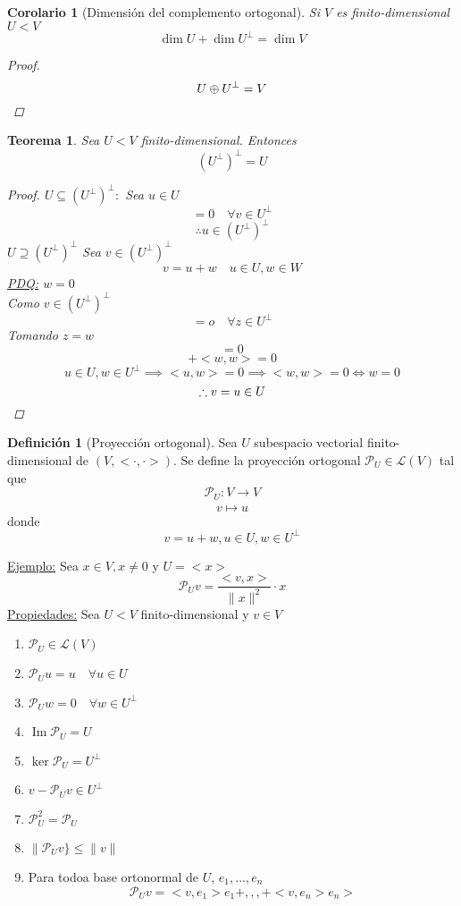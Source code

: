 \documentclass[11pt]{book}
\newcommand{\func}[5]{#1:#2\xrightarrow[#5]{#4}#3}
\DeclareMathOperator{\Ima}{Im}
\newtheorem{thm}{Teorema}[section]
\newtheorem*{cor}{Corolario}
\theoremstyle{definition}
\newtheorem{defn}{Definición}[section]
\begin{document}
\begin{cor}[Dimensión del complemento ortogonal]
	Si $V$ es finito-dimensional $U<V$
	\[\dim U+\dim U^\perp=\dim V\]
	\begin{proof}
		\[U\oplus U^\perp=V\qedhere\]
	\end{proof}
\end{cor}
\begin{thm}
	Sea $U<V$ finito-dimensional. Entonces
	\[(U^\perp)^\perp=U\]
	\begin{proof}
		\underline{$U\subseteq(U^\perp)^\perp:$} Sea $u\in U$
		\[<v,u>=0\quad\forall v\in U^\perp\]
		\[\therefore u\in (U^\perp)^\perp\]
		\underline{$U\supseteq(U^\perp)^\perp$} Sea $v\in (U^\perp)^\perp$
		\[v=u+w\quad u\in U,w\in W\]
		\underline{PDQ:} $w=0$\\
		Como $v\in (U^\perp)^\perp$
		\[<v,z>=o\quad\forall z\in U^\perp\]
		Tomando $z=w$
		\[<u+w,w>=0\]
		\[<u,w>+<w,w>=0\]
		\[u\in U, w\in U^\perp\implies <u,w>=0\implies <w,w>=0\iff w=0\]
		\[\therefore v=u\in U\qedhere\]
	\end{proof}
\end{thm}
\begin{defn}[Proyección ortogonal]
	Sea $U$ subespacio vectorial finito-dimensional de $(V,<\cdot,\cdot>)$. Se define la proyección ortogonal $\mathcal{P}_U\in\mathcal{L}(V)$ tal que
	\[\func{\mathcal{P}_U}{V}{V}{}{}\]
	\[v\mapsto u\]
	donde
	\[v=u+w, u\in U, w\in U^\perp\]
\end{defn}
\underline{Ejemplo:} Sea $x\in V,x\neq 0$ y $U=<x>$
\[\mathcal{P}_Uv=\frac{<v,x>}{\|x\|^2}\cdot x\]
\underline{Propiedades:} Sea $U<V$ finito-dimensional y $v\in V$
\begin{enumerate}[label=\textbf{(\alph*)}]
	\item $\mathcal{P}_U\in\mathcal{L}(V)$

	\item $\mathcal{P}_Uu=u\quad\forall u\in U$

	\item $\mathcal{P}_Uw=0\quad\forall w\in U^\perp$

	\item $\Ima\mathcal{P}_U=U$

	\item $\ker\mathcal{P}_U=U^\perp$

	\item $v-\mathcal{P}_Uv\in U^\perp$

	\item $\mathcal{P}_U^2=\mathcal{P}_U$

	\item $\|\mathcal{P}_Uv\}\leq\|v\|$

	\item Para todoa base ortonormal de $U$, $e_1,...,e_n$
	      \[\mathcal{P}_Uv=<v,e_1>e_1+,,,+<v,e_n>e_n>\]
\end{enumerate}
\end{document}
